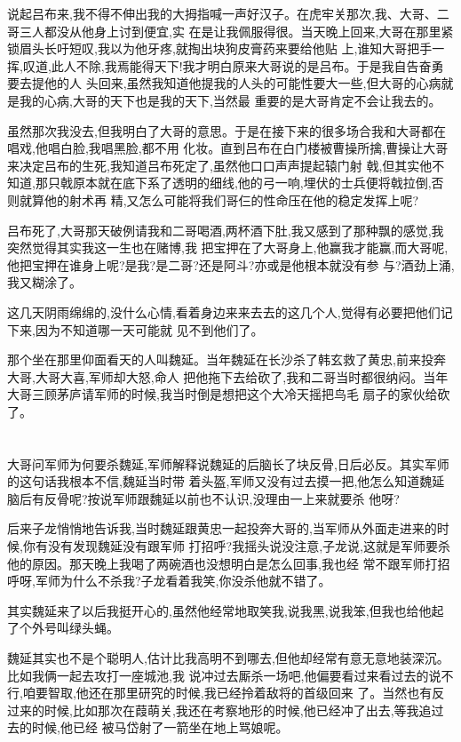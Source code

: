 ﻿\documentclass[12pt,twocolumn]{article}
\begin{document}
说起吕布来,我不得不伸出我的大拇指喊一声好汉子。在虎牢关那次,我、大哥、二哥三人都没从他身上讨到便宜,实
在是让我佩服得很。当天晚上回来,大哥在那里紧锁眉头长吁短叹,我以为他牙疼,就掏出块狗皮膏药来要给他贴
上,谁知大哥把手一挥,叹道,此人不除,我焉能得天下!我才明白原来大哥说的是吕布。于是我自告奋勇要去提他的人
头回来,虽然我知道他提我的人头的可能性要大一些,但大哥的心病就是我的心病,大哥的天下也是我的天下,当然最
重要的是大哥肯定不会让我去的。

虽然那次我没去,但我明白了大哥的意思。于是在接下来的很多场合我和大哥都在唱戏,他唱白脸,我唱黑脸,都不用
化妆。直到吕布在白门楼被曹操所擒,曹操让大哥来决定吕布的生死,我知道吕布死定了,虽然他口口声声提起辕门射
戟,但其实他不知道,那只戟原本就在底下系了透明的细线,他的弓一响,埋伏的士兵便将戟拉倒,否则就算他的射术再
精,又怎么可能将我们哥仨的性命压在他的稳定发挥上呢?

吕布死了,大哥那天破例请我和二哥喝酒,两杯酒下肚,我又感到了那种飘的感觉,我突然觉得其实我这一生也在赌博,我
把宝押在了大哥身上,他赢我才能赢,而大哥呢,他把宝押在谁身上呢?是我?是二哥?还是阿斗?亦或是他根本就没有参
与?酒劲上涌,我又糊涂了。

这几天阴雨绵绵的,没什么心情,看着身边来来去去的这几个人,觉得有必要把他们记下来,因为不知道哪一天可能就
见不到他们了。

那个坐在那里仰面看天的人叫魏延。当年魏延在长沙杀了韩玄救了黄忠,前来投奔大哥,大哥大喜,军师却大怒,命人
把他拖下去给砍了,我和二哥当时都很纳闷。当年大哥三顾茅庐请军师的时候,我当时倒是想把这个大冷天摇把鸟毛
扇子的家伙给砍了。

\section{}

大哥问军师为何要杀魏延,军师解释说魏延的后脑长了块反骨,日后必反。其实军师的这句话我根本不信,魏延当时带
着头盔,军师又没有过去摸一把,他怎么知道魏延脑后有反骨呢?按说军师跟魏延以前也不认识,没理由一上来就要杀
他呀?

后来子龙悄悄地告诉我,当时魏延跟黄忠一起投奔大哥的,当军师从外面走进来的时候,你有没有发现魏延没有跟军师
打招呼?我摇头说没注意,子龙说,这就是军师要杀他的原因。那天晚上我喝了两碗酒也没想明白是怎么回事,我也经
常不跟军师打招呼呀,军师为什么不杀我?子龙看着我笑,你没杀他就不错了。

其实魏延来了以后我挺开心的,虽然他经常地取笑我,说我黑,说我笨,但我也给他起了个外号叫绿头蝇。

魏延其实也不是个聪明人,估计比我高明不到哪去,但他却经常有意无意地装深沉。比如我俩一起去攻打一座城池,我
说冲过去厮杀一场吧,他偏要看过来看过去的说不行,咱要智取,他还在那里研究的时候,我已经拎着敌将的首级回来
了。当然也有反过来的时候,比如那次在葭萌关,我还在考察地形的时候,他已经冲了出去,等我追过去的时候,他已经
被马岱射了一箭坐在地上骂娘呢。
\end{document}
